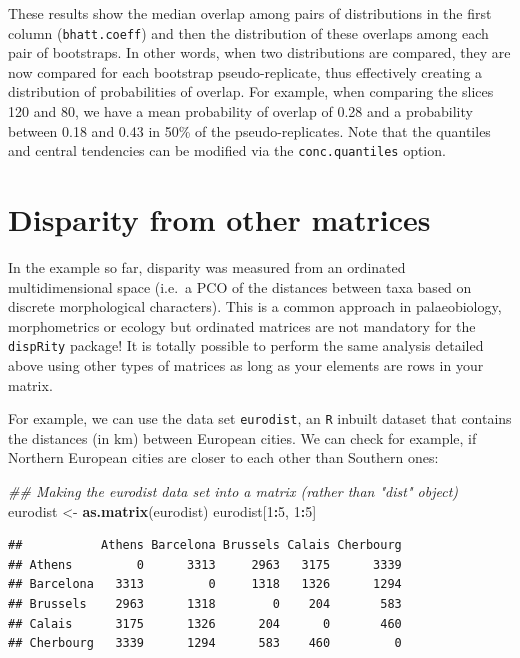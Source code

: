\documentclass[]{book}
\newenvironment{Shaded}{\begin{snugshade}}{\end{snugshade}}
\newcommand{\CommentTok}[1]{\textcolor[rgb]{0.56,0.35,0.01}{\textit{#1}}}
\newcommand{\DecValTok}[1]{\textcolor[rgb]{0.00,0.00,0.81}{#1}}
\newcommand{\KeywordTok}[1]{\textcolor[rgb]{0.13,0.29,0.53}{\textbf{#1}}}
\newcommand{\NormalTok}[1]{#1}
\newcommand{\OperatorTok}[1]{\textcolor[rgb]{0.81,0.36,0.00}{\textbf{#1}}}
\newcommand{\StringTok}[1]{\textcolor[rgb]{0.31,0.60,0.02}{#1}}
\begin{document}
These results show the median overlap among pairs of distributions in the first column (\texttt{bhatt.coeff}) and then the distribution of these overlaps among each pair of bootstraps.
In other words, when two distributions are compared, they are now compared for each bootstrap pseudo-replicate, thus effectively creating a distribution of probabilities of overlap.
For example, when comparing the slices 120 and 80, we have a mean probability of overlap of 0.28 and a probability between 0.18 and 0.43 in 50\% of the pseudo-replicates.
Note that the quantiles and central tendencies can be modified via the \texttt{conc.quantiles} option.

\hypertarget{other-matrices}{%
\section{Disparity from other matrices}\label{other-matrices}}

In the example so far, disparity was measured from an ordinated multidimensional space (i.e.~a PCO of the distances between taxa based on discrete morphological characters).
This is a common approach in palaeobiology, morphometrics or ecology but ordinated matrices are not mandatory for the \texttt{dispRity} package!
It is totally possible to perform the same analysis detailed above using other types of matrices as long as your elements are rows in your matrix.

For example, we can use the data set \texttt{eurodist}, an \texttt{R} inbuilt dataset that contains the distances (in km) between European cities.
We can check for example, if Northern European cities are closer to each other than Southern ones:

\begin{Shaded}
\begin{Highlighting}[]
\CommentTok{## Making the eurodist data set into a matrix (rather than "dist" object)}
\NormalTok{eurodist <-}\StringTok{ }\KeywordTok{as.matrix}\NormalTok{(eurodist)}
\NormalTok{eurodist[}\DecValTok{1}\OperatorTok{:}\DecValTok{5}\NormalTok{, }\DecValTok{1}\OperatorTok{:}\DecValTok{5}\NormalTok{]}
\end{Highlighting}
\end{Shaded}

\begin{verbatim}
##           Athens Barcelona Brussels Calais Cherbourg
## Athens         0      3313     2963   3175      3339
## Barcelona   3313         0     1318   1326      1294
## Brussels    2963      1318        0    204       583
## Calais      3175      1326      204      0       460
## Cherbourg   3339      1294      583    460         0
\end{verbatim}
\end{document}
